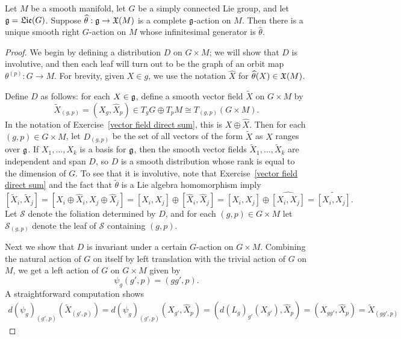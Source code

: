\begin{theorem}\label{Lie group action generated by infinitesimal}
Let $M$ be a smooth manifold, let $G$ be a simply connected Lie group, and let $\mathfrak{g}=\mathfrak{Lie}(G)$. Suppose $\widehat{\theta}:\mathfrak{g}\to\mathfrak{X}(M)$ is a complete $\mathfrak{g}$-action on $M$. Then there is a unique smooth right $G$-action on $M$ whose infinitesimal generator is $\widehat{\theta}$.
\end{theorem}
\begin{proof}
We begin by defining a distribution $D$ on $G\times M$; we will show that $D$ is involutive, and then each leaf will turn out to be the graph of an orbit map $\theta^{(p)}:G\to M$. For brevity, given $X\in g$, we use the notation $\widehat{X}$ for $\widehat{\theta}(X)\in\mathfrak{X}(M)$.\par
Define $D$ as follows: for each $X\in\mathfrak{g}$, define a smooth vector field $\widetilde{X}$ on $G\times M$ by
\[\widetilde{X}_{(g,p)}=(X_g,\widehat{X}_p)\in T_gG\oplus T_pM\cong T_{(g,p)}(G\times M).\]
In the notation of Exercise~\ref{vector field direct sum}, this is $X\oplus\widehat{X}$. Then for each $(g,p)\in G\times M$, let $D_{(g,p)}$ be the set of all vectors of the form $\widetilde{X}$ as $X$ ranges over $\mathfrak{g}$. If $X_1,\dots,X_k$ is a basis for $\mathfrak{g}$, then the smooth vector fields $\widetilde{X}_1,\dots,\widetilde{X}_k$ are independent and span $D$, so $D$ is a smooth distribution whose rank is equal to the dimension of $G$. To see that it is involutive, note that Exercise~\ref{vector field direct sum} and the fact that $\widetilde{\theta}$ is a Lie algebra homomorphism imply
\[[\widetilde{X}_i,\widetilde{X}_j]=[X_i\oplus\widehat{X}_i,X_j\oplus\widehat{X}_j]=[X_i,X_j]\oplus[\widehat{X}_i,\widehat{X}_j]=[X_i,X_j]\oplus\widehat{[X_i,X_j]}=\widetilde{[X_i,X_j]}.\]
Let $\mathcal{S}$ denote the foliation determined by $D$, and for each $(g,p)\in G\times M$ let $\mathcal{S}_{(g,p)}$ denote the leaf of $\mathcal{S}$ containing $(g,p)$.\par
Next we show that $D$ is invariant under a certain $G$-action on $G\times M$. Combining the natural action of $G$ on itself by left translation with the trivial action of $G$ on $M$, we get a left action of $G$ on $G\times M$ given by
\[\psi_g(g',p)=(gg',p).\]
A straightforward computation shows
\begin{align*}
d(\psi_g)_{(g',p)}(\widetilde{X}_{(g',p)})=d(\psi_g)_{(g',p)}(X_{g'},\widehat{X}_p)=(d(L_g)_{g'}(X_{g'}),\widehat{X}_p)=(X_{gg'},\widehat{X}_p)=\widetilde{X}_{(gg',p)}
\end{align*}

\end{proof}
